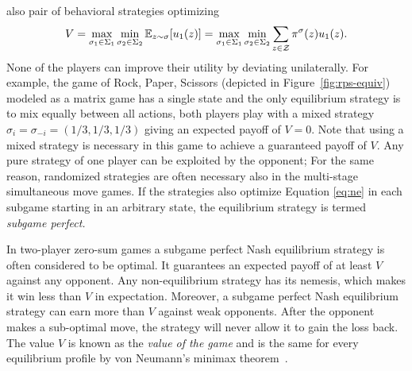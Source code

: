 also pair of behavioral strategies optimizing
\begin{equation}\label{eq:ne}
V = \max_{\sigma_1 \in \Sigma_1} \min_{\sigma_2 \in \Sigma_2} \mathbb{E}_{z \sim \sigma}[u_1(z)]
  = \max_{\sigma_1 \in \Sigma_1} \min_{\sigma_2 \in \Sigma_2} \sum_{z \in \mathcal{Z}} \pi^\sigma(z) u_1(z).
\end{equation}
None of the players can improve their utility by deviating unilaterally.
For example, the game of Rock, Paper, Scissors (depicted in Figure~\ref{fig:rps-equiv}) modeled as a matrix game has a single state and the only equilibrium strategy is to mix equally between
all actions, \ie both players play with a mixed strategy $\sigma_i = \sigma_{-i} = (1/3, 1/3, 1/3)$ giving an expected payoff of
$V = 0$.
Note that using a mixed strategy is necessary in this game to achieve a guaranteed payoff of $V$.
Any pure strategy of one player can be exploited by the opponent; 
For the same reason, randomized strategies are often necessary also in the multi-stage simultaneous move games.
If the strategies also optimize Equation \ref{eq:ne} in each subgame starting in an arbitrary state, the equilibrium strategy
is termed {\it subgame perfect.}

In two-player zero-sum games a subgame perfect Nash equilibrium strategy is often considered to be optimal.
It guarantees an expected payoff of at least $V$ against any opponent. Any non-equilibrium strategy has its nemesis, which makes it win less
than $V$ in expectation. Moreover, a subgame perfect Nash equilibrium strategy can earn more than $V$ against weak opponents. After the
opponent makes a sub-optimal move, the strategy will never allow it to gain the loss back.
The value $V$ is known as the \emph{value of the game} and is the same for every equilibrium
profile by von Neumann's minimax theorem~\cite{VonNeumann1928}.

